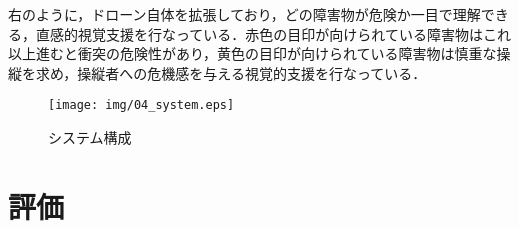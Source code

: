 \documentclass[submit, sigrecommended]{ipsj}
\begin{document}
右のように，ドローン自体を拡張しており，どの障害物が危険か一目で理解できる，直感的視覚支援を行なっている．赤色の目印が向けられている障害物はこれ以上進むと衝突の危険性があり，黄色の目印が向けられている障害物は慎重な操縦を求め，操縦者への危機感を与える視覚的支援を行なっている．


\begin{figure}[tb]
  \centering
  \texttt{[image: img/04\_system.eps]}
  \caption{システム構成}
  \label{fig:04_system}
\end{figure}
  

\section{評価}
\end{document}
